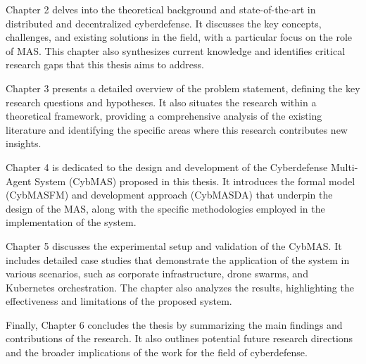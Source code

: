 Chapter 2 delves into the theoretical background and state-of-the-art in distributed and decentralized cyberdefense. It discusses the key concepts, challenges, and existing solutions in the field, with a particular focus on the role of MAS. This chapter also synthesizes current knowledge and identifies critical research gaps that this thesis aims to address.

Chapter 3 presents a detailed overview of the problem statement, defining the key research questions and hypotheses. It also situates the research within a theoretical framework, providing a comprehensive analysis of the existing literature and identifying the specific areas where this research contributes new insights.

Chapter 4 is dedicated to the design and development of the Cyberdefense Multi-Agent System (CybMAS) proposed in this thesis. It introduces the formal model (CybMASFM) and development approach (CybMASDA) that underpin the design of the MAS, along with the specific methodologies employed in the implementation of the system.

Chapter 5 discusses the experimental setup and validation of the CybMAS. It includes detailed case studies that demonstrate the application of the system in various scenarios, such as corporate infrastructure, drone swarms, and Kubernetes orchestration. The chapter also analyzes the results, highlighting the effectiveness and limitations of the proposed system.

Finally, Chapter 6 concludes the thesis by summarizing the main findings and contributions of the research. It also outlines potential future research directions and the broader implications of the work for the field of cyberdefense.





